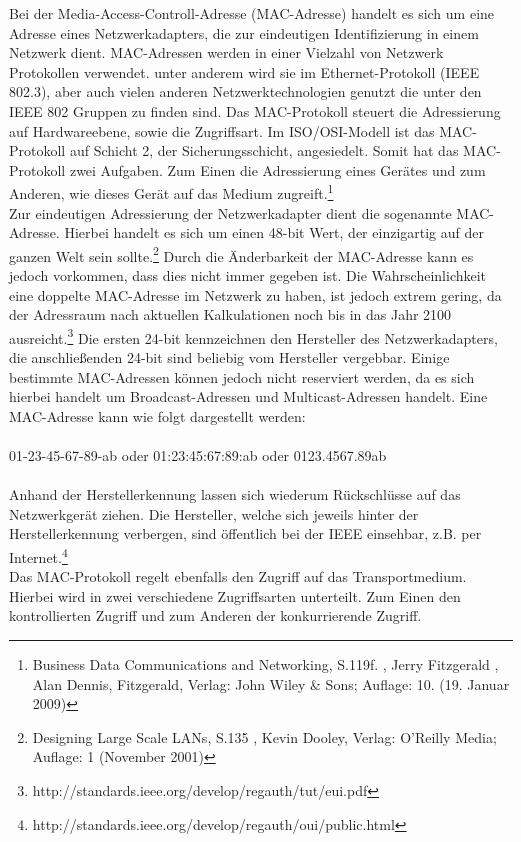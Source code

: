 Bei der Media-Access-Controll-Adresse (MAC-Adresse) handelt es sich um eine Adresse eines Netzwerkadapters, die zur eindeutigen Identifizierung in einem Netzwerk dient.
MAC-Adressen werden in einer Vielzahl von Netzwerk Protokollen verwendet.
unter anderem wird sie im Ethernet-Protokoll (IEEE 802.3), aber auch vielen anderen Netzwerktechnologien genutzt die unter den IEEE 802 Gruppen zu finden sind.
Das MAC-Protokoll steuert die Adressierung auf Hardwareebene, sowie die Zugriffsart.
Im ISO/OSI-Modell ist das MAC-Protokoll auf Schicht 2, der Sicherungsschicht, angesiedelt.
Somit hat das MAC-Protokoll zwei Aufgaben.
Zum Einen die Adressierung eines Gerätes und zum Anderen, wie dieses Gerät auf das Medium zugreift.\footnote{Business Data Communications and Networking, S.119f. , Jerry Fitzgerald , Alan Dennis, Fitzgerald, Verlag: John Wiley \& Sons; Auflage: 10. (19. Januar 2009)}\\
Zur eindeutigen Adressierung der Netzwerkadapter  dient die sogenannte MAC-Adresse. Hierbei handelt es sich um einen 48-bit Wert, der einzigartig auf der ganzen Welt sein sollte.\footnote{Designing Large Scale LANs, S.135 , Kevin Dooley, Verlag: O'Reilly Media; Auflage: 1 (November 2001)} Durch die Änderbarkeit der MAC-Adresse kann es jedoch vorkommen, dass dies nicht immer gegeben ist.
Die Wahrscheinlichkeit eine doppelte MAC-Adresse im Netzwerk zu haben, ist jedoch extrem gering, da der Adressraum nach aktuellen Kalkulationen noch bis in das Jahr 2100 ausreicht.\footnote{http://standards.ieee.org/develop/regauth/tut/eui.pdf} Die ersten 24-bit kennzeichnen den Hersteller des Netzwerkadapters, die anschließenden 24-bit sind beliebig vom Hersteller vergebbar.
Einige bestimmte MAC-Adressen können jedoch nicht reserviert werden, da es sich hierbei handelt um Broadcast-Adressen und Multicast-Adressen handelt.
Eine MAC-Adresse kann wie folgt dargestellt werden:\\
\\
01-23-45-67-89-ab oder 01:23:45:67:89:ab oder 0123.4567.89ab\\
\\
Anhand der Herstellerkennung lassen sich wiederum Rückschlüsse auf das Netzwerkgerät ziehen.
Die Hersteller, welche sich jeweils hinter der Herstellerkennung verbergen, sind öffentlich bei der IEEE einsehbar, z.B. per Internet.\footnote{http://standards.ieee.org/develop/regauth/oui/public.html}\\
Das MAC-Protokoll regelt ebenfalls den Zugriff auf das Transportmedium. Hierbei wird in zwei verschiedene Zugriffsarten unterteilt. Zum Einen den kontrollierten Zugriff und zum Anderen der konkurrierende Zugriff.
